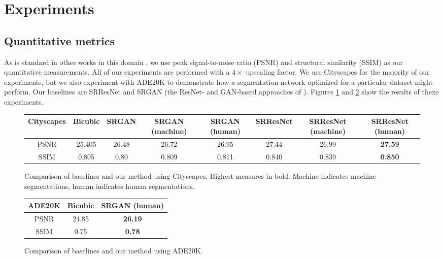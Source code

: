 \documentclass[10pt,twocolumn,letterpaper]{article}
\begin{document}

\section{Experiments}
\label{sec:results}

\subsection{Quantitative metrics}
As is standard in other works in this domain \cite{SRCNN, SRGAN,
PerceptualLosses, DeeplyRecursive}, we use peak signal-to-noise ratio (PSNR)
and structural similarity (SSIM) as our quantitative measurements. All of our
experiments are performed with a $4 \times$ upscaling factor. We use Cityscapes
for the majority of our experiments, but we also experiment with ADE20K to
demonstrate how a segmentation network optimized for a particular dataset might
perform. Our baselines are SRResNet and SRGAN (the ResNet- and GAN-based
approaches of \cite{SRGAN}). Figures \ref{fig:quantResultsCityscapes} and
\ref{fig:quantResultsADE} show the results of thexe experiments.

\begin{figure}[ht!]
    \begin{center}
        \small
        \begin{tabular}{c ccccccc}
            \textbf{Cityscapes} & Bicubic & SRGAN & SRGAN (machine) & SRGAN
            (human) & SRResNet & SRResNet (machine) & SRResNet (human) \\
            \hline
            PSNR & 25.405 & 26.48 & 26.72 & 26.95 & 27.44 & 26.99 &
            \textbf{27.59} \\
            SSIM & 0.805 & 0.80 & 0.809 & 0.811 & 0.840 & 0.839 &
            \textbf{0.850}
        \end{tabular}
    \end{center}
    \caption{Comparison of baselines and our method using Cityscapes. Highest
    measures in bold. Machine indicates machine segmentations, human indicates
    human segmentations.}
    \label{fig:quantResultsCityscapes}
\end{figure}

\begin{figure}[ht!]
    \begin{center}
        \small
        \begin{tabular}{c cc}
            \textbf{ADE20K} & Bicubic & SRGAN (human) \\
            \hline
            PSNR & 24.85 & \textbf{26.19} \\
            SSIM & 0.75 & \textbf{0.78}
        \end{tabular}
    \end{center}
    \caption{Comparison of baselines and our method using ADE20K.}
    \label{fig:quantResultsADE}
\end{figure}
\end{document}

